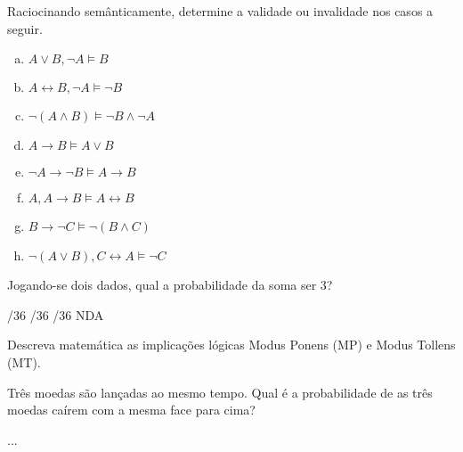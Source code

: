 \documentclass[12pt]{exam} %
\begin{document}
\begin{questions}



\question Raciocinando semânticamente, determine a validade ou invalidade nos casos a seguir.
 
\begin{multicols}{2}
  \begin{enumerate}[(a)]

    \item 
     $A \lor B, \neg A \vDash B$

    \item
     $A \leftrightarrow B, \neg A \vDash \neg B$

    \item
     $\neg \left( A\land B \right)\vDash \neg B\land \neg A$

    \item
     $A\rightarrow B\vDash A\lor B$

    \item
     $\neg A\rightarrow \neg B\vDash A\rightarrow B$

    \item
     $A, A\rightarrow B\vDash A\leftrightarrow B$

    \item
     $B\rightarrow \neg C\vDash \neg(B\land C)$

    \item
     $\neg(A\lor B), C\leftrightarrow A\vDash \neg C$

  \end{enumerate}
\end{multicols}

\question Jogando-se dois dados, qual a probabilidade da soma ser 3?
\newline
\begin{oneparcheckboxes}
    /36
    /36
    /36
    \choice NDA
\end{oneparcheckboxes}

\question Descreva matemática as implicações lógicas Modus Ponens (MP) e Modus Tollens (MT).
\fillwithdottedlines{2cm}


\question Três moedas são lançadas ao mesmo tempo. Qual é a probabilidade de as três moedas caírem com a mesma face para cima? 
\begin{solution}[2cm]
    ...
\end{solution}



\end{questions}
\end{document}
